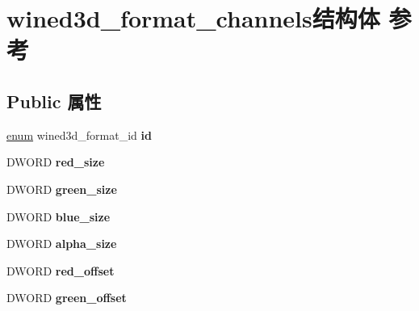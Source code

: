 \hypertarget{structwined3d__format__channels}{}\section{wined3d\+\_\+format\+\_\+channels结构体 参考}
\label{structwined3d__format__channels}
\subsection*{Public 属性}
\begin{DoxyCompactItemize}
\item 
\mbox{\label{structwined3d__format__channels_a3402af3c3da963f8db2eb105fa3e3086}} 
\hyperlink{interfaceenum}{enum} wined3d\+\_\+format\+\_\+id {\bfseries id}
\item 
\mbox{\label{structwined3d__format__channels_aa301cb47989ea286ca71177255c02750}} 
D\+W\+O\+RD {\bfseries red\+\_\+size}
\item 
\mbox{\label{structwined3d__format__channels_a7049e6fa7f6edb442b0753cde812f24c}} 
D\+W\+O\+RD {\bfseries green\+\_\+size}
\item 
\mbox{\label{structwined3d__format__channels_a7d3bfef59077bdac59069dedd66c8dfb}} 
D\+W\+O\+RD {\bfseries blue\+\_\+size}
\item 
\mbox{\label{structwined3d__format__channels_ac9269fedb676cc42ff20db5cef336422}} 
D\+W\+O\+RD {\bfseries alpha\+\_\+size}
\item 
\mbox{\label{structwined3d__format__channels_a5a1f7aafa177b8db398720c0087d9ad9}} 
D\+W\+O\+RD {\bfseries red\+\_\+offset}
\item 
\mbox{\label{structwined3d__format__channels_ac9533646a4872b2a1efbaaba9585099c}} 
D\+W\+O\+RD {\bfseries green\+\_\+offset}
\item 
\mbox{\label{structwined3d__format__channels_afb7a9762f0cd2f2b336439a1dd155de4}} 

\end{DoxyCompactItemize}
